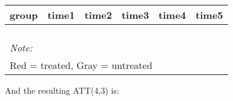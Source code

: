 \documentclass[
]{article}
\begin{document}
\begin{table}
\centering
\begin{tabular}[t]{>{}r|>{}r|>{}r|>{}r|>{}r|>{}r}
\hline
group & time1 & time2 & time3 & time4 & time5\\
\hline
\cellcolor{white}{2} & \cellcolor{white}{0.631} & \cellcolor{white}{\textcolor{black}{0.711}} & \cellcolor{white}{\textcolor{black}{0.814}} & \cellcolor{white}{0.846} & \cellcolor{white}{0.826}\\
\hline
\cellcolor{white}{3} & \cellcolor{white}{0.678} & \cellcolor{white}{\textcolor{black}{0.770}} & \cellcolor{white}{\textcolor{black}{0.664}} & \cellcolor{white}{0.800} & \cellcolor{white}{0.784}\\
\hline
\cellcolor{white}{4} & \cellcolor{white}{0.778} & \cellcolor{red}{\textcolor{black}{0.807}} & \cellcolor{red}{\textcolor{black}{0.673}} & \cellcolor{white}{0.750} & \cellcolor{white}{0.868}\\
\hline
\cellcolor{white}{5} & \cellcolor{white}{0.854} & \cellcolor{lightgray}{\textcolor{black}{0.939}} & \cellcolor{lightgray}{\textcolor{black}{0.854}} & \cellcolor{white}{0.800} & \cellcolor{white}{0.855}\\
\hline
\multicolumn{6}{l}{\rule{0pt}{1em}\textit{Note: }}\\
\multicolumn{6}{l}{\rule{0pt}{1em}Red = treated, Gray = untreated}\\
\end{tabular}
\end{table}

And the resulting ATT(4,3) is:
\end{document}
